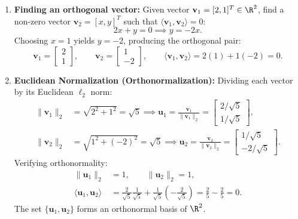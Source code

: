 \begin{example}
\mbox{}\par\nopagebreak
\begin{enumerate}
    \item \textbf{Finding an orthogonal vector:}
    Given vector $\mathbf{v}_1 = [2, 1]^T \in \R^2$, find a non-zero vector $\mathbf{v}_2 = [x, y]^T$ such that $\langle \mathbf{v}_1, \mathbf{v}_2 \rangle = 0$:
    \begin{equation}
        2x + y = 0 \implies y = -2x.
    \end{equation}
    Choosing $x = 1$ yields $y = -2$, producing the orthogonal pair:
    \begin{equation}
        \mathbf{v}_1 = \begin{bmatrix} 2 \\ 1 \end{bmatrix}, \qquad \mathbf{v}_2 = \begin{bmatrix} 1 \\ -2 \end{bmatrix}, \qquad \langle \mathbf{v}_1, \mathbf{v}_2 \rangle = 2(1) + 1(-2) = 0.
    \end{equation}
    \item \textbf{Euclidean Normalization (Orthonormalization):}
    Dividing each vector by its Euclidean $\ell_2$ norm:
    \begin{align}
        \|\mathbf{v}_1\|_2 &= \sqrt{2^2 + 1^2} = \sqrt{5} \implies \mathbf{u}_1 = \frac{\mathbf{v}_1}{\|\mathbf{v}_1\|_2} = \begin{bmatrix} 2/\sqrt{5} \\ 1/\sqrt{5} \end{bmatrix}, \\
        \|\mathbf{v}_2\|_2 &= \sqrt{1^2 + (-2)^2} = \sqrt{5} \implies \mathbf{u}_2 = \frac{\mathbf{v}_2}{\|\mathbf{v}_2\|_2} = \begin{bmatrix} 1/\sqrt{5} \\ -2/\sqrt{5} \end{bmatrix}.
    \end{align}
    Verifying orthonormality:
    \begin{align}
        \|\mathbf{u}_1\|_2 &= 1, \qquad \|\mathbf{u}_2\|_2 = 1, \\
        \langle \mathbf{u}_1, \mathbf{u}_2 \rangle &= \frac{2}{\sqrt{5}}\frac{1}{\sqrt{5}} + \frac{1}{\sqrt{5}}\left(-\frac{2}{\sqrt{5}}\right) = \frac{2}{5} - \frac{2}{5} = 0.
    \end{align}
    The set $\{\mathbf{u}_1, \mathbf{u}_2\}$ forms an orthonormal basis of $\R^2$.
\end{enumerate}
\end{example}

